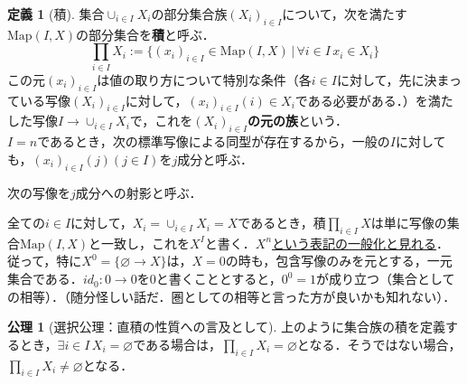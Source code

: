 \documentclass[uplatex, 12pt, dvipdfmx]{jsreport}
\theoremstyle{definition}
\newtheorem{definition}[theorem]{定義}
\newtheorem{axiom}[theorem]{公理}
\theoremstyle{StatementsWithStar}
\theoremstyle{StatementsWithStar2}
\theoremstyle{StatementsWithStar3}
\theoremstyle{StatementsWithCCirc}
\theoremstyle{definition}
\begin{document}
        \begin{definition}[積]集合$\cup_{i\in I}X_i$の部分集合族$(X_i)_{i\in I}$について，次を満たす$\mathrm{Map}(I,X)$の部分集合を\textbf{積}と呼ぶ．
            $$\prod_{i\in I}X_i := \{ (x_i)_{i\in I}\in \mathrm{Map}(I,X)\, |\, \forall i\in I \, x_i\in X_i \}$$
            この元$(x_i)_{i\in I}$は値の取り方について特別な条件（各$i\in I$に対して，先に決まっている写像$(X_i)_{i\in I}$に対して，$(x_i)_{i\in I}(i)\in X_i$である必要がある．）を満たした写像$I\to \cup_{i\in I}X_i$で，これを\textbf{$(X_i)_{i\in I}$の元の族}という．\\
            $I=n$であるとき，次の標準写像による同型が存在するから，一般の$I$に対しても，$(x_i)_{i\in I}(j) (j\in I)$を$j$成分と呼ぶ．
            \begin{center}\end{center}
            次の写像を$j$成分への射影と呼ぶ．
            \begin{center}\end{center}
            全ての$i\in I$に対して，$X_i=\cup_{i\in I}X_i=X$であるとき，積$\prod_{i\in I}X$は単に写像の集合$\mathrm{Map}(I,X)$と一致し，これを$X^I$と書く．\underline{$X^n$という表記の一般化と見れる}．\\
            従って，特に$X^0=\{\varnothing\to X\}$は，$X=0$の時も，包含写像のみを元とする，一元集合である．$id_0:0\to 0$を$0$と書くこととすると，$0^0=1$が成り立つ（集合としての相等）．（随分怪しい話だ．圏としての相等と言った方が良いかも知れない）．
        \end{definition}
        \begin{axiom}[選択公理：直積の性質への言及として]
            上のように集合族の積を定義するとき，$\exists i\in I\, X_i=\varnothing$である場合は，$\prod_{i\in I}X_i=\varnothing$となる．そうではない場合，$\prod_{i\in I}X_i\ne\varnothing$となる．
        \end{axiom}
\end{document}
